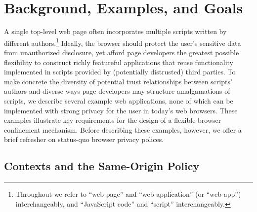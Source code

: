 \section{Background, Examples, and Goals}

A single top-level web page often incorporates multiple scripts
written by different authors.\footnote{Throughout we refer to ``web
  page'' and ``web application'' (or ``web app'') interchangeably, and
  ``JavaScript code'' and ``script'' interchangeably.} Ideally, the
browser should protect the user's sensitive data from unauthorized
disclosure, yet afford page developers the greatest possible
flexibility to construct richly featureful applications that reuse
functionality implemented in scripts provided by (potentially
distrusted) third parties. To make concrete the diversity of potential
trust relationships between scripts' authors and diverse ways page
developers may structure amalgamations of scripts, we describe several
example web applications, none of which can be implemented with strong
privacy for the user in today's web browsers. These examples
illustrate key requirements for the design of a flexible browser
confinement mechanism. Before describing these examples, however, we
offer a brief refresher on status-quo browser privacy polices.

\subsection{Contexts and the Same-Origin Policy}
\label{sec:goals}

